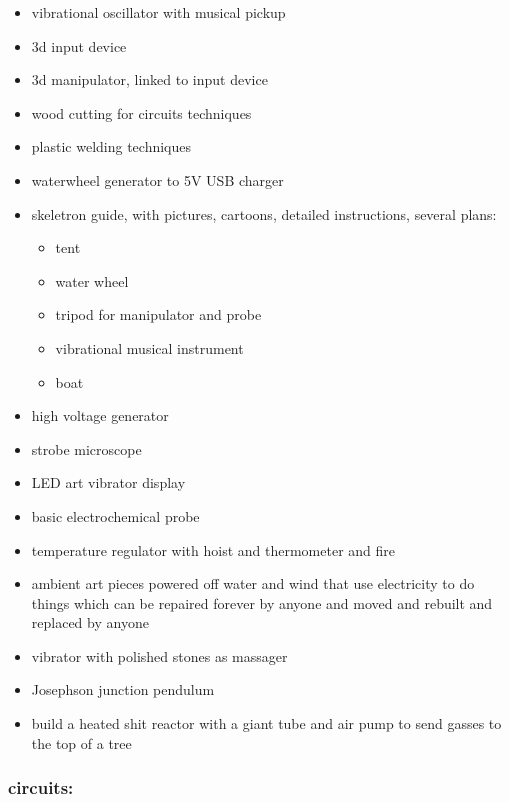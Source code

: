 \begin{itemize}
\tightlist
\item
  vibrational oscillator with musical pickup
\item
  3d input device
\item
  3d manipulator, linked to input device
\item
  wood cutting for circuits techniques
\item
  plastic welding techniques
\item
  waterwheel generator to 5V USB charger
\item
  skeletron guide, with pictures, cartoons, detailed instructions,
  several plans:

  \begin{itemize}
  \tightlist
  \item
    tent
  \item
    water wheel
  \item
    tripod for manipulator and probe
  \item
    vibrational musical instrument
  \item
    boat
  \end{itemize}
\item
  high voltage generator
\item
  strobe microscope
\item
  LED art vibrator display
\item
  basic electrochemical probe
\item
  temperature regulator with hoist and thermometer and fire
\item
  ambient art pieces powered off water and wind that use electricity to
  do things which can be repaired forever by anyone and moved and
  rebuilt and replaced by anyone
\item
  vibrator with polished stones as massager
\item
  Josephson junction pendulum
\item
  build a heated shit reactor with a giant tube and air pump to send
  gasses to the top of a tree
\end{itemize}

\subsubsection{circuits:}\label{circuits}

